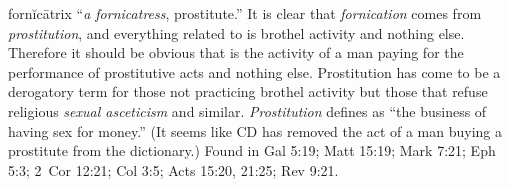 fornĭcātrix ``\emph{a fornicatress}, prostitute.'' 
It is clear that \emph{fornication} comes from \emph{prostitution}, and everything related to  is brothel activity and nothing else. Therefore it should be obvious that  is the activity of a man paying for the performance of prostitutive acts and nothing else. Prostitution has come to be a derogatory term for those not practicing brothel activity but those that refuse religious \emph{sexual asceticism} and similar. \emph{Prostitution} defines as ``the business of having sex for money.'' (It seems like CD has removed the act of a man buying a prostitute from the dictionary.)
Found in Gal 5:19; Matt 15:19; Mark 7:21; Eph 5:3; 2~Cor 12:21; Col 3:5; Acts 15:20, 21:25; Rev 9:21.
